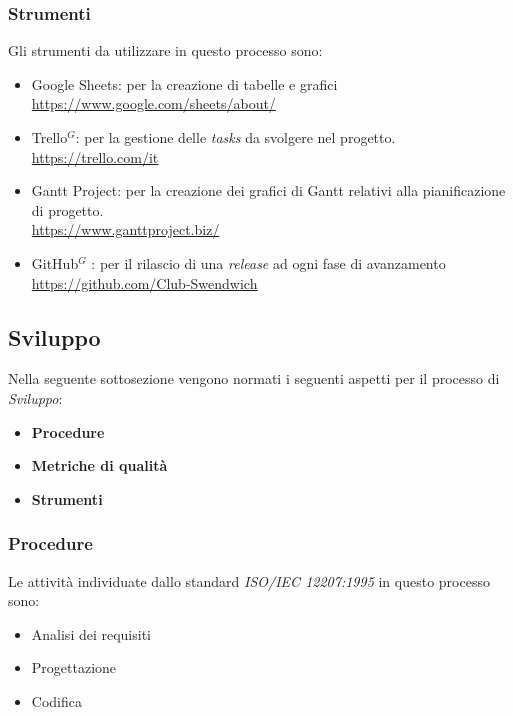 \subsubsection{Strumenti}
Gli strumenti da utilizzare in questo processo sono:

\begin{itemize}
    \item Google Sheets: per la creazione di tabelle e grafici \\
    \href{https://www.google.com/sheets/about/}{https://www.google.com/sheets/about/}
    \item Trello$^G$: per la gestione delle \textit{tasks} da svolgere nel progetto.\\
    \href{https://trello.com/it}{https://trello.com/it}
    \item Gantt Project: per la creazione dei grafici di Gantt relativi alla pianificazione di progetto.\\
    \href{https://www.ganttproject.biz/}{https://www.ganttproject.biz/}
    \item GitHub$^G$ : per il rilascio di una \textit{release} ad ogni fase di avanzamento\\
    \href{https://github.com/Club-Swendwich}{https://github.com/Club-Swendwich}
\end{itemize}

\newpage
\subsection{Sviluppo}
Nella seguente sottosezione vengono normati i seguenti aspetti per il
processo di \textit{Sviluppo}:
\begin{itemize}
    \item \textbf{Procedure}
    \item \textbf{Metriche di qualità}
    \item \textbf{Strumenti}
\end{itemize}

\subsubsection{Procedure}

Le attività individuate dallo standard \textit{ISO/IEC 12207:1995} in questo processo sono:
\begin{itemize}
    \item Analisi dei requisiti
    \item Progettazione
    \item Codifica
\end{itemize}

